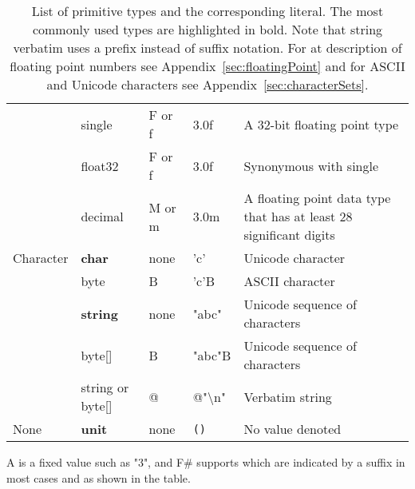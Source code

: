 \begin{table}
\begin{tabularx}{\textwidth}{|l|l|l|l|>{\raggedright\arraybackslash}X|}
             & single & F or f  & 3.0f &A 32-bit floating point type\\
             &float32 & F or f  & 3.0f &Synonymous with single\\
             &decimal &M or m & 3.0m &A floating point data type that has at least 28 significant digits\\
    \hline
    Character &\textbf{char} & none  & 'c' &Unicode character\\
             &byte & B  & 'c'B & ASCII character\\
             &\textbf{string} & none  & "abc" & Unicode sequence of characters\\
             &byte[] & B  & "abc"B & Unicode sequence of characters\\
             &string or byte[] & @  & @"\textbackslash n" & Verbatim string\\
    \hline
    None &\textbf{unit} &none & \texttt{()} & No value denoted\\
    \hline
  \end{tabularx}
  \caption{List of primitive types and the corresponding literal. The most commonly used types are highlighted in bold. Note that string verbatim uses a prefix instead of suffix notation. For at description of floating point numbers see Appendix~\ref{sec:floatingPoint} and for ASCII and Unicode characters see Appendix~\ref{sec:characterSets}.}
  \label{tab:primitiveTypes}
\end{table}
A  is a fixed value such as "3", and F\# supports  which are indicated by a suffix in most cases and as shown in the table.

